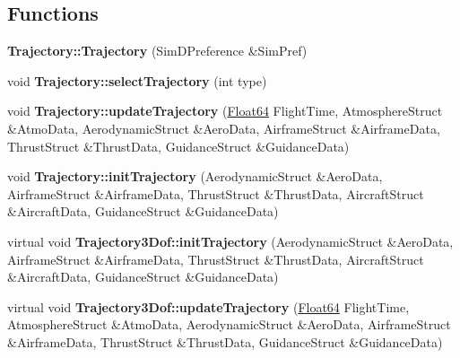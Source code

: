 \subsection*{Functions}
\begin{DoxyCompactItemize}
\item 
\mbox{\label{group___trajectory_ga8d2001c718f24b178ca0dd84ec1a3960}} 
{\bfseries Trajectory\+::\+Trajectory} (Sim\+D\+Preference \&Sim\+Pref)
\item 
\mbox{\label{group___trajectory_gade7c1162e2dbb9b6a58e4b14edc47a23}} 
void {\bfseries Trajectory\+::select\+Trajectory} (int type)
\item 
\mbox{\label{group___trajectory_ga281eabbd48c553f15f393ed906642a3f}} 
void {\bfseries Trajectory\+::update\+Trajectory} (\hyperlink{group___tools_ga3f1431cb9f76da10f59246d1d743dc2c}{Float64} Flight\+Time, Atmosphere\+Struct \&Atmo\+Data, Aerodynamic\+Struct \&Aero\+Data, Airframe\+Struct \&Airframe\+Data, Thrust\+Struct \&Thrust\+Data, Guidance\+Struct \&Guidance\+Data)
\item 
\mbox{\label{group___trajectory_ga3104447fe2b96a3471362eec02e937f0}} 
void {\bfseries Trajectory\+::init\+Trajectory} (Aerodynamic\+Struct \&Aero\+Data, Airframe\+Struct \&Airframe\+Data, Thrust\+Struct \&Thrust\+Data, Aircraft\+Struct \&Aircraft\+Data, Guidance\+Struct \&Guidance\+Data)
\item 
\mbox{\label{group___trajectory_ga304011b4296d0ac38bcee32a760405ea}} 
virtual void {\bfseries Trajectory3\+Dof\+::init\+Trajectory} (Aerodynamic\+Struct \&Aero\+Data, Airframe\+Struct \&Airframe\+Data, Thrust\+Struct \&Thrust\+Data, Aircraft\+Struct \&Aircraft\+Data, Guidance\+Struct \&Guidance\+Data)
\item 
\mbox{\label{group___trajectory_gafc82799754ef6c2813bc862c5bc1c3e9}} 
virtual void {\bfseries Trajectory3\+Dof\+::update\+Trajectory} (\hyperlink{group___tools_ga3f1431cb9f76da10f59246d1d743dc2c}{Float64} Flight\+Time, Atmosphere\+Struct \&Atmo\+Data, Aerodynamic\+Struct \&Aero\+Data, Airframe\+Struct \&Airframe\+Data, Thrust\+Struct \&Thrust\+Data, Guidance\+Struct \&Guidance\+Data)
\item 

\end{DoxyCompactItemize}
